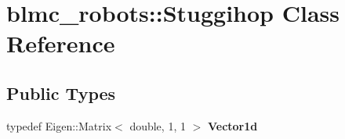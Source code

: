 \hypertarget{classblmc__robots_1_1Stuggihop}{}\section{blmc\+\_\+robots\+:\+:Stuggihop Class Reference}
\label{classblmc__robots_1_1Stuggihop}
\subsection*{Public Types}
\begin{DoxyCompactItemize}
\item 
\mbox{\label{classblmc__robots_1_1Stuggihop_adbada259f1383ec01148bad4256c2b9f}} 
typedef Eigen\+::\+Matrix$<$ double, 1, 1 $>$ {\bfseries Vector1d}
\end{DoxyCompactItemize}
